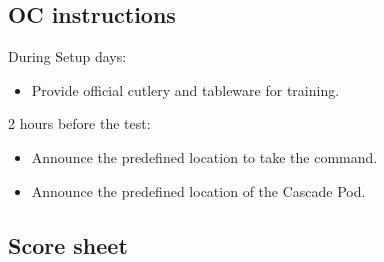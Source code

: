 \subsection{OC instructions}
During Setup days:
\begin{itemize}
	\item Provide official cutlery and tableware for training.
\end{itemize}

2 hours before the test:
\begin{itemize}
	\item Announce the predefined location to take the command.
	\item Announce the predefined location of the Cascade Pod.
\end{itemize}

\newpage
\subsection{Score sheet}



